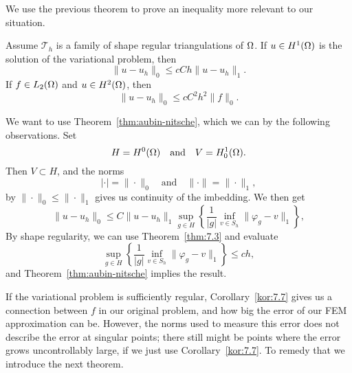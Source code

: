 We use the previous theorem to prove an inequality more relevant to our situation.
\begin{kor}{\quad\label{kor:7.7}}
   Assume $\mathcal{T}_h$ is a family of shape regular triangulations of $\Omega$.
   If $u\in H^1(\Omega)$ is the solution of the variational problem, then 
   \begin{equation*}
    \|u-u_h\|_0 \leq cCh \|u-u_h\|_1.
   \end{equation*}
   If $f\in L_2(\Omega)$ and $u\in H^2(\Omega)$, then 
   \begin{equation*}
    \|u-u_h\|_0 \leq cC^2h^2 \|f\|_0.
   \end{equation*}
\end{kor}
\begin{bev}
   We want to use Theorem~\ref{thm:aubin-nitsche}, which we can by 
   the following observations. Set 
    \begin{equation*}
        H = H^0(\Omega) \quad \text{and} \quad V = H^1_0(\Omega).
    \end{equation*}
    Then $V \subset H$, and the norms 
    \begin{equation*}
        |\cdot| = \|\cdot\|_0 \quad \text{and} \quad \|\cdot\| = \|\cdot\|_1,
    \end{equation*}
    by $\|\cdot\|_0 \leq \|\cdot\|_1$ gives us continuity of the imbedding.
    We then get
    \begin{equation*}
        \|u-u_h\|_0 \leq C \|u-u_h\|_1 \sup_{g\in H} \left \{ \frac{1}{|g|} \inf_{v \in S_h} \|\varphi_g - v\|_1 \right \},
    \end{equation*}
    By shape regularity, we can use Theorem~\ref{thm:7.3} and evaluate 
    \begin{equation*}
        \sup_{g\in H} \left \{ \frac{1}{|g|} \inf_{v \in S_h} \|\varphi_g - v\|_1 \right \}
        \leq ch,
    \end{equation*}
    and Theorem~\ref{thm:aubin-nitsche} implies the result.
\end{bev}
If the variational problem is sufficiently regular,
Corollary~\ref{kor:7.7} gives us a connection between $f$ in our original problem, 
and how big the error of our FEM approximation can be. 
However, the norms used to measure this error does not describe the error at singular points; there still might be points where the error grows uncontrollably large, 
if we just use Corollary~\ref{kor:7.7}. 
To remedy that we introduce the next theorem. 
